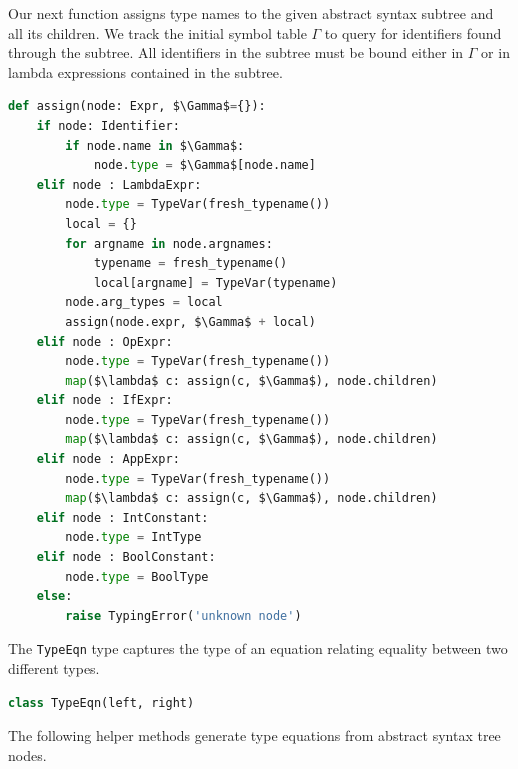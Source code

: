 \documentclass[book.tex]{subfiles}
\begin{document}
Our next function assigns type names to the given abstract syntax subtree and all its children. We track the initial symbol table $\Gamma$ to query for identifiers found through the subtree. All identifiers in the subtree must be bound either in $\Gamma$ or in lambda expressions contained in the subtree.
\begin{lstlisting}[language=python]
def assign(node: Expr, $\Gamma$={}):
    if node: Identifier:
        if node.name in $\Gamma$:
            node.type = $\Gamma$[node.name]
    elif node : LambdaExpr:
        node.type = TypeVar(fresh_typename())
        local = {}
        for argname in node.argnames:
            typename = fresh_typename()
            local[argname] = TypeVar(typename)
        node.arg_types = local
        assign(node.expr, $\Gamma$ + local)
    elif node : OpExpr:
        node.type = TypeVar(fresh_typename())
        map($\lambda$ c: assign(c, $\Gamma$), node.children)
    elif node : IfExpr:
        node.type = TypeVar(fresh_typename())
        map($\lambda$ c: assign(c, $\Gamma$), node.children)
    elif node : AppExpr:
        node.type = TypeVar(fresh_typename())
        map($\lambda$ c: assign(c, $\Gamma$), node.children)
    elif node : IntConstant:
        node.type = IntType
    elif node : BoolConstant:
        node.type = BoolType
    else:
        raise TypingError('unknown node')
\end{lstlisting}

%
The \lstinline{TypeEqn} type captures the type of an equation relating equality between two different types.
\begin{lstlisting}[language=python]
class TypeEqn(left, right)
\end{lstlisting}
The following helper methods generate type equations from abstract syntax tree nodes.
\end{document}
